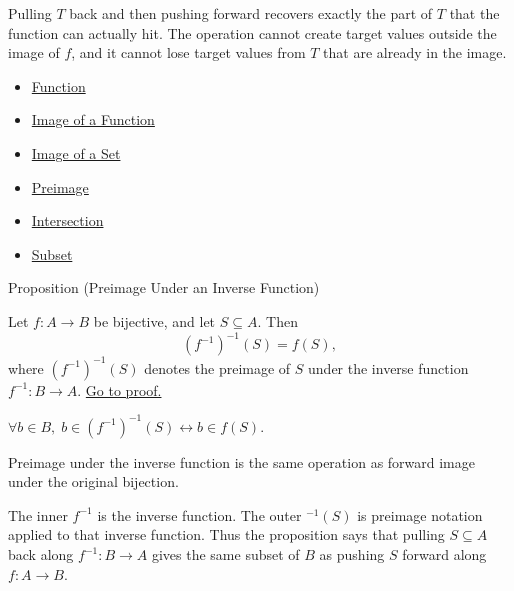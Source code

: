 \begin{remark*}[Interpretation]
Pulling $T$ back and then pushing forward recovers exactly the part of $T$
that the function can actually hit.  The operation cannot create target values
outside the image of $f$, and it cannot lose target values from $T$ that are
already in the image.
\end{remark*}

\begin{dependencies}
\begin{itemize}
  \item \hyperref[def:function]{Function}
  \item \hyperref[def:image-function]{Image of a Function}
  \item \hyperref[def:image-set]{Image of a Set}
  \item \hyperref[def:preimage]{Preimage}
  \item \hyperref[def:intersection]{Intersection}
  \item \hyperref[def:subset]{Subset}
\end{itemize}
\end{dependencies}

\begin{propositionbox}{Proposition (Preimage Under an Inverse Function)}
\begin{proposition}\label{prop:preimage-under-inverse-function}
Let $f:A\to B$ be bijective, and let $S\subseteq A$. Then
\[
(f^{-1})^{-1}(S)=f(S),
\]
where $(f^{-1})^{-1}(S)$ denotes the preimage of $S$ under the inverse
function $f^{-1}:B\to A$.
\hyperref[prf:preimage-under-inverse-function]{Go to proof.}
\end{proposition}
\end{propositionbox}

\begin{remark*}
$\forall b\in B,\; b\in (f^{-1})^{-1}(S)\leftrightarrow b\in f(S)$.
\end{remark*}

\begin{remark*}[Interpretation]
Preimage under the inverse function is the same operation as forward image
under the original bijection.
\end{remark*}

\begin{remark*}[Exposition]
The inner $f^{-1}$ is the inverse function. The outer ${}^{-1}(S)$ is
preimage notation applied to that inverse function. Thus the proposition says
that pulling $S\subseteq A$ back along $f^{-1}:B\to A$ gives the same subset of
$B$ as pushing $S$ forward along $f:A\to B$.
\end{remark*}


